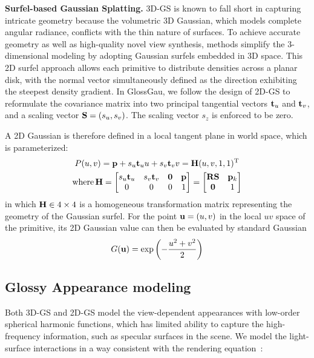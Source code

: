 \noindent\textbf{Surfel-based Gaussian Splatting.}
3D-GS is known to fall short in capturing intricate geometry because the volumetric 3D Gaussian, which models complete angular radiance, conflicts with the thin nature of surfaces. To achieve accurate geometry as well as high-quality novel view synthesis, methods \cite{Huang2DGS2024, dai2024high} simplify the 3-dimensional modeling by adopting Gaussian surfels embedded in 3D space. This 2D surfel approach allows each primitive to distribute densities across a planar disk, with the normal vector simultaneously defined as the direction exhibiting the steepest density gradient. In GlossGau, we follow the design of 2D-GS \cite{Huang2DGS2024} to reformulate the covariance matrix into two principal tangential vectors $\mathbf{t}_u$ and $\mathbf{t}_v$, and a scaling vector $\mathbf{S} = (s_u,s_v)$. The scaling vector $s_z$ is enforced to be zero. 


A 2D Gaussian is therefore defined in a local tangent plane in world space, which is parameterized:
\begin{gather}
    P(u,v) = \mathbf{p} + s_u \mathbf{t}_u u + s_v \mathbf{t}_v v = \mathbf{H}(u,v,1,1)^{\mathrm{T}}\\
    \text{where} \, \mathbf{H} = 
    \begin{bmatrix}
        s_u \mathbf{t}_u & s_v \mathbf{t}_v & \boldsymbol{0} & \mathbf{p} \\
        0 & 0 & 0 & 1 \\
    \end{bmatrix} = \begin{bmatrix}
        \mathbf{R}\mathbf{S} & \mathbf{p}_k \\ 
        \boldsymbol{0} & 1\\
    \end{bmatrix}
    \label{eq:plane-to-world}
\end{gather}
in which $\mathbf{H} \in {4\times 4}$ is a homogeneous transformation matrix representing the geometry of the Gaussian surfel. For the point $\mathbf{u}=(u,v)$ in the local $uv$ space of the primitive, its 2D Gaussian value can then be evaluated by standard Gaussian
\begin{equation}
G(\mathbf{u}) = \exp\left(-\frac{u^2+v^2}{2}\right)
    \label{eq:gaussian-2d}
\end{equation} 

\subsection{Glossy Appearance modeling}
Both 3D-GS and 2D-GS model the view-dependent appearances with low-order spherical harmonic functions, which has limited ability to capture the high-frequency information, such as specular surfaces in the scene. We model the light-surface interactions in a way consistent with the rendering equation~\cite{kajiya1986rendering}: 

